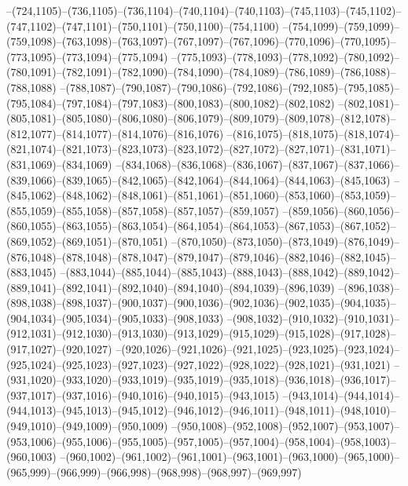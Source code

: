 --(724,1105)--(736,1105)--(736,1104)--(740,1104)--(740,1103)--(745,1103)--(745,1102)--(747,1102)--(747,1101)--(750,1101)--(750,1100)--(754,1100)
--(754,1099)--(759,1099)--(759,1098)--(763,1098)--(763,1097)--(767,1097)--(767,1096)--(770,1096)--(770,1095)--(773,1095)--(773,1094)--(775,1094)
--(775,1093)--(778,1093)--(778,1092)--(780,1092)--(780,1091)--(782,1091)--(782,1090)--(784,1090)--(784,1089)--(786,1089)--(786,1088)--(788,1088)
--(788,1087)--(790,1087)--(790,1086)--(792,1086)--(792,1085)--(795,1085)--(795,1084)--(797,1084)--(797,1083)--(800,1083)--(800,1082)--(802,1082)
--(802,1081)--(805,1081)--(805,1080)--(806,1080)--(806,1079)--(809,1079)--(809,1078)--(812,1078)--(812,1077)--(814,1077)--(814,1076)--(816,1076)
--(816,1075)--(818,1075)--(818,1074)--(821,1074)--(821,1073)--(823,1073)--(823,1072)--(827,1072)--(827,1071)--(831,1071)--(831,1069)--(834,1069)
--(834,1068)--(836,1068)--(836,1067)--(837,1067)--(837,1066)--(839,1066)--(839,1065)--(842,1065)--(842,1064)--(844,1064)--(844,1063)--(845,1063)
--(845,1062)--(848,1062)--(848,1061)--(851,1061)--(851,1060)--(853,1060)--(853,1059)--(855,1059)--(855,1058)--(857,1058)--(857,1057)--(859,1057)
--(859,1056)--(860,1056)--(860,1055)--(863,1055)--(863,1054)--(864,1054)--(864,1053)--(867,1053)--(867,1052)--(869,1052)--(869,1051)--(870,1051)
--(870,1050)--(873,1050)--(873,1049)--(876,1049)--(876,1048)--(878,1048)--(878,1047)--(879,1047)--(879,1046)--(882,1046)--(882,1045)--(883,1045)
--(883,1044)--(885,1044)--(885,1043)--(888,1043)--(888,1042)--(889,1042)--(889,1041)--(892,1041)--(892,1040)--(894,1040)--(894,1039)--(896,1039)
--(896,1038)--(898,1038)--(898,1037)--(900,1037)--(900,1036)--(902,1036)--(902,1035)--(904,1035)--(904,1034)--(905,1034)--(905,1033)--(908,1033)
--(908,1032)--(910,1032)--(910,1031)--(912,1031)--(912,1030)--(913,1030)--(913,1029)--(915,1029)--(915,1028)--(917,1028)--(917,1027)--(920,1027)
--(920,1026)--(921,1026)--(921,1025)--(923,1025)--(923,1024)--(925,1024)--(925,1023)--(927,1023)--(927,1022)--(928,1022)--(928,1021)--(931,1021)
--(931,1020)--(933,1020)--(933,1019)--(935,1019)--(935,1018)--(936,1018)--(936,1017)--(937,1017)--(937,1016)--(940,1016)--(940,1015)--(943,1015)
--(943,1014)--(944,1014)--(944,1013)--(945,1013)--(945,1012)--(946,1012)--(946,1011)--(948,1011)--(948,1010)--(949,1010)--(949,1009)--(950,1009)
--(950,1008)--(952,1008)--(952,1007)--(953,1007)--(953,1006)--(955,1006)--(955,1005)--(957,1005)--(957,1004)--(958,1004)--(958,1003)--(960,1003)
--(960,1002)--(961,1002)--(961,1001)--(963,1001)--(963,1000)--(965,1000)--(965,999)--(966,999)--(966,998)--(968,998)--(968,997)--(969,997)
